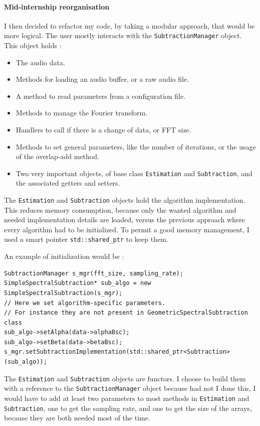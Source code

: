 \paragraph{Mid-internship reorganisation}
I then decided to refactor my code, by taking a modular approach, that would be more logical.
The user mostly interacts with the \texttt{SubtractionManager} object. This object holds : 
\begin{itemize}
\item The audio data.
\item Methods for loading an audio buffer, or a raw audio file.
\item A method to read parameters from a configuration file.
\item Methods to manage the Fourier transform.
\item Handlers to call if there is a change of data, or FFT size.
\item Methods to set general parameters, like the number of iterations, or the usage of the overlap-add method.
\item Two very important objects, of base class \texttt{Estimation} and \texttt{Subtraction}, and the associated getters and setters.
\end{itemize}
The \texttt{Estimation} and \texttt{Subtraction} objects hold the algorithm implementation. This reduces memory consumption, because only the wanted algorithm and needed implementation details are loaded, versus the previous approach where every algorithm had to be initialized. To permit a good memory management, I used a  smart pointer \texttt{std::shared\_ptr} to keep them.

An example of initialization would be : 
\begin{lstlisting}[caption=Example initialization]
SubtractionManager s_mgr(fft_size, sampling_rate);
SimpleSpectralSubtraction* sub_algo = new SimpleSpectralSubtraction(s_mgr);
// Here we set algorithm-specific parameters.
// For instance they are not present in GeometricSpectralSubtraction class
sub_algo->setAlpha(data->alphaBsc); 
sub_algo->setBeta(data->betaBsc);
s_mgr.setSubtractionImplementation(std::shared_ptr<Subtraction>(sub_algo));
\end{lstlisting}

The \texttt{Estimation} and \texttt{Subtraction} objects are functors. I choose to build them with a reference to the \texttt{SubtractionManager} object because had not I done this, I would have to add at least two parameters to most methods in \texttt{Estimation} and \texttt{Subtraction}, one to get the sampling rate, and one to get the size of the arrays, because they are both needed most of the time.

